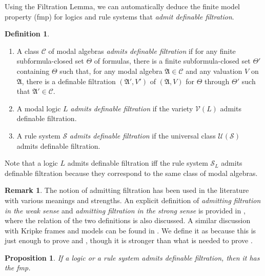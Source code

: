 \documentclass[a4paper,11pt]{article}
\newtheorem{proposition}[theorem]{Proposition}
\theoremstyle{definition}
\newtheorem{definition}[theorem]{Definition}
\newtheorem{remark}[theorem]{Remark}
\theoremstyle{remark}
\numberwithin{theorem}{section}
\newcommand{\alg}[1]{\mathfrak{#1}}
\newcommand{\A}{\alg{A}}
\newcommand{\class}[1]{\mathcal{#1}}
\newcommand{\V}{\class{V}}
\newcommand{\U}{\class{U}}
\newcommand{\C}{\class{C}}
\renewcommand{\S}{\class{S}}
\renewcommand{\S}{\mathcal{S}}
\begin{document}
Using the Filtration Lemma, we can automatically deduce the finite model property (fmp) for logics and rule systems that \emph{admit definable filtration}.

\begin{definition} \label{3: Def admit filtration} \leavevmode
    \begin{enumerate}
        \item A class $\C$ of modal algebras \emph{admits definable filtration} if for any finite subformula-closed set $\Theta$ of formulas, there is a finite subformula-closed set $\Theta'$ containing $\Theta$ such that, for any modal algebra $\A \in \C$ and any valuation $V$ on $\A$, there is a definable filtration $(\A', V')$ of $(\A, V)$ for $\Theta$ through $\Theta'$ such that $\A' \in \C$.
        \item  A modal logic $L$ \emph{admits definable filtration} if the variety $\V(L)$ admits definable filtration. 
        \item A rule system $\S$ \emph{admits definable filtration} if the universal class $\U(\S)$ admits definable filtration. 
    \end{enumerate}
   
\end{definition}

Note that a logic $L$ admits definable filtration iff the rule system $\S_L$ admits definable filtration because they correspond to the same class of modal algebras.

\begin{remark}
    The notion of admitting filtration has been used in the literature with various meanings and strengths. An explicit definition of \emph{admitting filtration in the weak sense} and \emph{admitting filtration in the strong sense} is provided in \cite{stablemodallogic}, where the relation of the two definitions is also discussed. A similar discussion with Kripke frames and models can be found in \cite{Kikot2020}. We define it as  because this is just enough to prove  and , though it is stronger than what is needed to prove .
\end{remark}

\begin{proposition} \label{3: Prop filtration implies fmp}
    If a logic or a rule system admits definable filtration, then it has the fmp.
\end{proposition}
\end{document}

